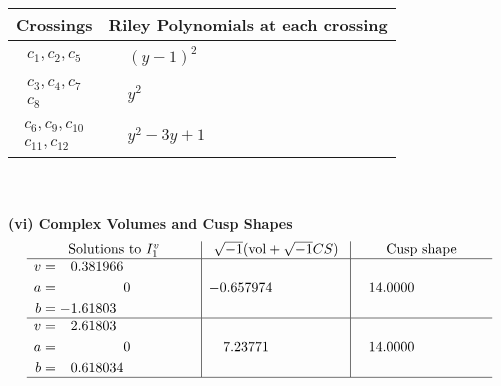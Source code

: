 \documentclass[1p]{elsarticle_modified}
\theoremstyle{definition}
\newcommand{\I}{\sqrt{-1}}
\begin{document}
\begin{tabular}{m{50pt}|m{274pt}}
Crossings & \hspace{64pt}Riley Polynomials at each crossing \\
\hline $$\begin{aligned}c_{1},c_{2},c_{5}\end{aligned}$$&$\begin{aligned}
&(y-1)^2
\end{aligned}$\\
\hline $$\begin{aligned}c_{3},c_{4},c_{7}\\c_{8}\end{aligned}$$&$\begin{aligned}
&y^2
\end{aligned}$\\
\hline $$\begin{aligned}c_{6},c_{9},c_{10}\\c_{11},c_{12}\end{aligned}$$&$\begin{aligned}
&y^2-3 y+1
\end{aligned}$\\
\hline
\end{tabular}\\~\\
\newpage\flushleft \textbf{(vi) Complex Volumes and Cusp Shapes}
$$\begin{array}{c|c|c}  
\text{Solutions to }I^v_{1}& \I (\text{vol} + \sqrt{-1}CS) & \text{Cusp shape}\\
 \hline 
\begin{aligned}
v &= \phantom{-}0.381966\phantom{ +0.000000I} \\
a &= \phantom{-0.000000 } 0 \\
b &= -1.61803\phantom{ +0.000000I}\end{aligned}
 & -0.657974\phantom{ +0.000000I} & \phantom{-}14.0000\phantom{ +0.000000I} \\ \hline\begin{aligned}
v &= \phantom{-}2.61803\phantom{ +0.000000I} \\
a &= \phantom{-0.000000 } 0 \\
b &= \phantom{-}0.618034\phantom{ +0.000000I}\end{aligned}
 & \phantom{-}7.23771\phantom{ +0.000000I} & \phantom{-}14.0000\phantom{ +0.000000I}\\
 \hline 
 \end{array}$$\newpage
\newpage\renewcommand{\arraystretch}{1}
\end{document}
